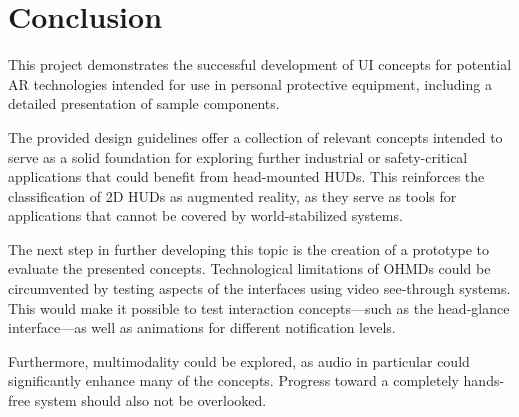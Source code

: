 \section{Conclusion}

This project demonstrates the successful development of UI concepts for potential AR technologies intended for use in personal protective equipment, including a detailed presentation of sample components.

The provided design guidelines offer a collection of relevant concepts intended to serve as a solid foundation for exploring further industrial or safety-critical applications that could benefit from head-mounted HUDs. This reinforces the classification of 2D HUDs as augmented reality, as they serve as tools for applications that cannot be covered by world-stabilized systems.

The next step in further developing this topic is the creation of a prototype to evaluate the presented concepts.
Technological limitations of OHMDs could be circumvented by testing aspects of the interfaces using video see-through systems. This would make it possible to test interaction concepts—such as the head-glance interface—as well as animations for different notification levels.

Furthermore, multimodality could be explored, as audio in particular could significantly enhance many of the concepts.
Progress toward a completely hands-free system should also not be overlooked.
